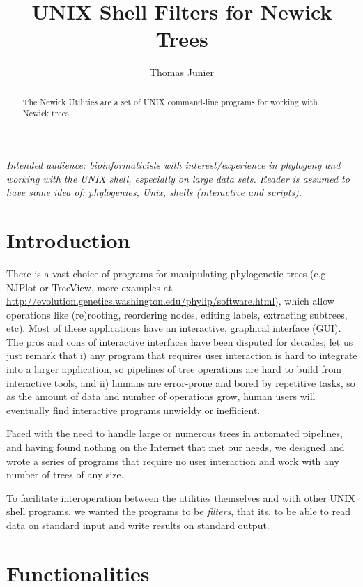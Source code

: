 \documentclass[a4paper,10pt]{article}
\title{UNIX Shell Filters for Newick Trees}
\author{Thomas Junier}
\newcommand{\gui}{\textsc{GUI}}
\begin{document}
\maketitle

\begin{abstract}
The Newick Utilities are a set of UNIX command-line programs for working with
Newick trees.
\end{abstract}

\textit{Intended audience: bioinformaticists with interest/experience in phylogeny and working with the UNIX shell, especially on large data sets. Reader is assumed to have some idea of: phylogenies, Unix, shells (interactive and scripts).}
 
\section{Introduction}

There is a vast choice of programs for manipulating phylogenetic trees (e.g.
NJPlot or TreeView, more examples at \url{
http://evolution.genetics.washington.edu/phylip/software.html}), which allow
operations like (re)rooting, reordering nodes, editing labels, extracting
subtrees, etc). Most of these applications have an interactive, graphical interface (\gui{}). The pros and cons of interactive interfaces have been disputed for decades; let us just remark that i) any program that requires user interaction is hard to integrate into a larger application, so pipelines of tree operations are hard to build from interactive tools, and ii) humans are error-prone and  bored by repetitive tasks, so as the amount of data and number of operations grow, human users will eventually find interactive programs unwieldy or inefficient. 

Faced with the need to
handle large or numerous trees in automated pipelines, and having found nothing on the Internet that met our needs, we designed and wrote
a series of programs that require no user interaction and work with any number of
trees of any size.

To facilitate interoperation between the utilities themselves and with other UNIX shell programs, we wanted the programs to be \textit{filters}, that its, to be able to read data on standard input and write results on standard output. 

\section{Functionalities}
\end{document}
